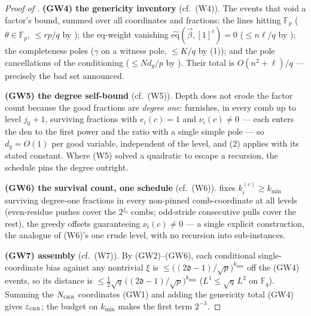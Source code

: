 \documentclass{article}
\newcommand{\Fp}{\mathbb{F}_p}
\newcommand{\Fq}{\mathbb{F}_q}
\newcommand{\extdeg}{\mathfrak{d}}
\newcommand{\eqf}{\widehat{\mathrm{eq}}}
\theoremstyle{definition}
\begin{document}
\begin{proof}[Proof of ]
\textbf{(GW4) the genericity inventory} (cf.\ (W4)). The events that void a factor's bound, summed over all coordinates and fractions: the lines hitting $\Fp$ ($\theta \in \Fp$, $\leq r p/q$ by ); the eq-weight vanishing $\eqf(\vec\beta, [1]^\ell) = 0$ ($\leq n\ell/q$ by ); the completeness poles ($\gamma$ on a witness pole, $\leq K/q$ by (1)); and the pole cancellations of the conditioning ($\leq N d_g/p$ by ). Their total is $O(n^2 + \ell)/q$ --- precisely the bad set  announced.

\textbf{(GW5) the degree self-bound} (cf.\ (W5)). Depth does not erode the factor count because the good fractions are \emph{degree one}:  furnishes, in every comb up to level $j_0+1$, surviving fractions with $e_i(c) = 1$ and $\nu_i(c) \neq 0$ --- each enters the den to the first power and the ratio with a single simple pole --- so $d_g = O(1)$ per good variable, independent of the level, and (2) applies with its stated constant. Where (W5) solved a quadratic to escape a recursion, the schedule pins the degree outright.

\textbf{(GW6) the survival count, one schedule} (cf.\ (W6)).  fixes $k_i^{(c)} \geq k_{\min}$ surviving degree-one fractions in every non-pinned comb-coordinate at all levels (even-residue pushes cover the $2^{j_0}$ combs; odd-stride consecutive pulls cover the rest), the greedy offsets guaranteeing $\nu_i(c) \neq 0$ --- a single explicit construction, the analogue of (W6)'s one crude level, with no recursion into sub-instances.

\textbf{(GW7) assembly} (cf.\ (W7)). By (GW2)--(GW6), each conditional single-coordinate bias against any nontrivial $\xi$ is $\leq \big((2\extdeg-1)/\sqrt p\big)^{k_{\min}}$ off the (GW4) events, so its distance is $\leq \tfrac12\sqrt q\,\big((2\extdeg-1)/\sqrt p\big)^{k_{\min}}$ ($L^1 \leq \sqrt q\, L^2$ on $\Fq$). Summing the $N_{\textsc{gkr}}$ coordinates (GW1) and adding the genericity total (GW4) gives $\varepsilon_{\textsc{gkr}}$; the budget on $k_{\min}$ makes the first term $2^{-\lambda}$.
\end{proof}
\end{document}
